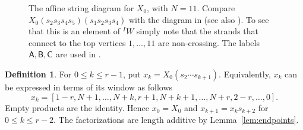 \documentclass[11pt,a4paper,reqno]{amsart}
\numberwithin{equation}{section}
\theoremstyle{definition}
\newtheorem{definition}[theorem]{Definition}
\theoremstyle{remark}
\theoremstyle{plain}
\newcommand{\A}{\mathsf A}
\newcommand{\B}{\mathsf B}
\newcommand{\CC}{\mathsf C}
\begin{document}
\begin{figure}[htbp]

  \vspace{-0.8cm}
  \caption{The affine string diagram for $X_0$, with
  $N=11$.
  Compare $X_0(s_2s_3s_4s_5)(s_1s_2s_3s_4)$ with the diagram in   (see also  ). 
  To see that this is an element of $^I W$ simply note that the strands 
  that connect to the top vertices $1,\dots ,11$ are non-crossing. 
  The labels $\sf A, B, C$ are used in .
  }
  \label{figure2}
\end{figure}





\begin{definition}\label{def:chains}
For $0\leq k\leq r-1$, put
 $   x_k=X_0(s_2\cdots s_{k+1})$.  
Equivalently, $x_k$ can be expressed in terms of its window as follows 
\begin{equation}\label{eq:chains}
 x_k=[1-r,N+1,\ldots,N+k,r+1,
      N+k+1,\ldots,N+r,2-r,\ldots,0].
\end{equation}
Empty products are the identity. Hence $x_0=X_0$ and
$x_{k+1}=x_ks_{k+2}$ for $0\leq k\leq r-2$.
The factorizations are length additive by Lemma~\ref{lem:endpoints}.
\end{definition}

\end{document}
